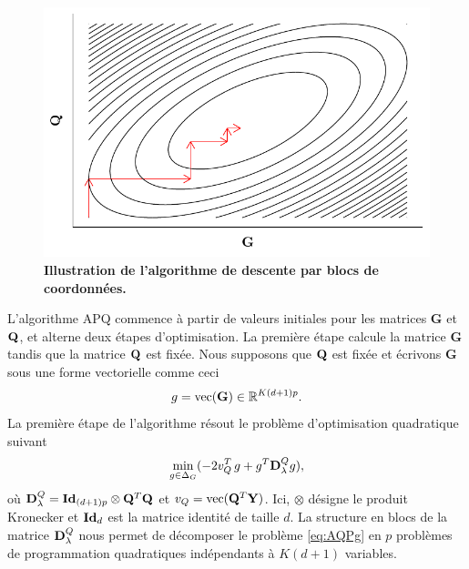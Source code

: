 \documentclass[12pt,a4paper,twoside]{ugathesis}
\begin{document}
\begin{figure}[t]
\centering
\includegraphics{./OUTPUT/Rplots/coordinate_descente.pdf}
\caption{{\bf Illustration de l'algorithme de descente par blocs de
    coordonnées.}}
\label{fig:coordinate_descente}
\end{figure}

L'algorithme APQ commence à partir de valeurs initiales pour les matrices
\(\mathbf{G}\) et \(\mathbf{Q}\), et alterne deux étapes d'optimisation. La première étape
calcule la matrice \(\mathbf{G}\) tandis que la matrice \(\mathbf{Q}\) est fixée. Nous
supposons que \(\mathbf{Q}\) est fixée et écrivons \(\mathbf{G}\) sous une forme vectorielle
comme ceci
\begin{equation*} 
g = {\rm vec}(\mathbf{G}) \in \mathbb{R} ^ {K(d +1)p}.
\end{equation*}
La première étape de l'algorithme résout le problème d'optimisation
quadratique suivant 
\begin{equation}
\begin{aligned}
\underset{g \in \Delta_{G}}{\min}  ( -2  v^T_Q \, g + g^T \mathbf{D}_{\lambda}^{Q} g ) ,
\end{aligned}
\label{eq:AQPg}
\end{equation}
où \(\mathbf{D}_{\lambda}^{Q} = \mathbf{Id}_{(d + 1) p} \otimes \mathbf{Q}^T \mathbf{Q}\) et \(v_Q = {\rm vec} (\mathbf{Q}^T \mathbf{Y})\).
Ici, \(\otimes\) désigne le produit Kronecker et \(\mathbf{Id}_{d}\) est la matrice identité
de taille \(d\). La structure en blocs de la matrice \(\mathbf{D}_{\lambda}^{Q}\) nous permet de
décomposer le problème \eqref{eq:AQPg} en \(p\) problèmes de programmation
quadratiques indépendants à \(K(d + 1)\) variables.
\end{document}
